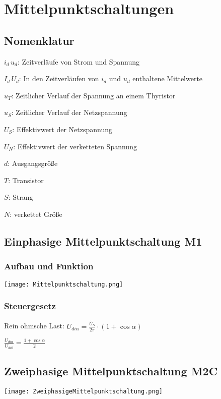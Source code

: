 \documentclass[german]{latex4ei/latex4ei_sheet}
\begin{document}
\section{Mittelpunktschaltungen}
	\begin{sectionbox}
		\subsection{Nomenklatur}
			\begin{bluebox}
				\item $i_d\,u_d$: Zeitverläufe von Strom und Spannung
				\item $I_d\,U_d$: In den Zeitverläufen von $i_d$ und $u_d$ enthaltene Mittelwerte
				\item $u_T$: Zeitlicher Verlauf der Spannung an einem Thyristor
				\item $u_S$: Zeitlicher Verlauf der Netzspannung
				\item $U_S$: Effektivwert der Netzspannung
				\item $U_N$: Effektivwert der verketteten Spannung
				\item $d$: Ausgangsgröße
				\item $T$: Transistor
				\item $S$: Strang
				\item $N$: verkettet Größe
			\end{bluebox}
		\begin{symbolbox}
		\subsection{Einphasige Mittelpunktschaltung M1}
			\subsubsection{Aufbau und Funktion}
				\texttt{[image: Mittelpunktschaltung.png]}
			\subsubsection{Steuergesetz}
					Rein ohmsche Last: $U_{di\alpha} = \frac{\hat{U}_S}{2\pi}\cdot (1+\cos  \alpha)$

					$\frac{U_{di\alpha}}{U_{di0}} = \frac{1+\cos \alpha}{2}$
		\end{symbolbox}
		\begin{symbolbox}
			\subsection{Zweiphasige Mittelpunktschaltung M2C}
			\texttt{[image: ZweiphasigeMittelpunktschaltung.png]}


\end{symbolbox}
\end{sectionbox}
\end{document}

